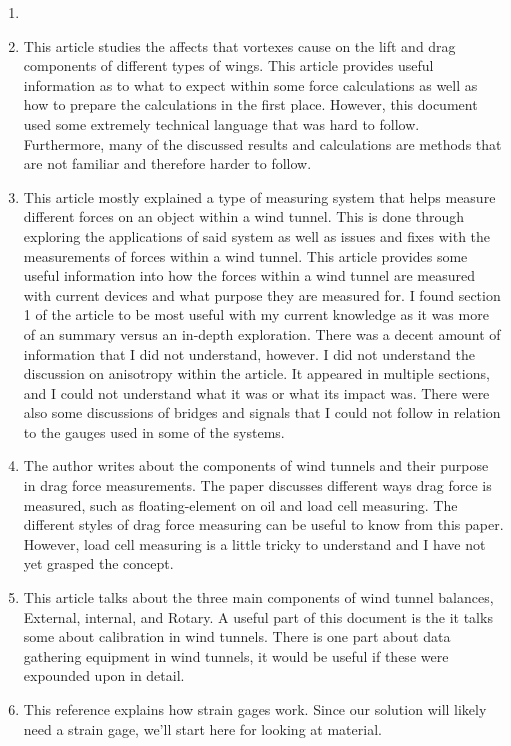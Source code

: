 \documentclass[12pt,letterpaper]{article}
\begin{document}
\begin{enumerate}
	\item \cite{Nan2013}
	\item \cite{Gerontakos2007} This article studies the affects that vortexes cause on the lift and drag components of different types of wings. This article provides useful information as to what to expect within some force calculations as well as how to prepare the calculations in the first place. However, this document used some extremely technical language that was hard to follow. Furthermore, many of the discussed results and calculations are methods that are not familiar and therefore harder to follow.
	\item \cite{Portman2009} This article mostly explained a type of measuring system that helps measure different forces on an object within a wind tunnel. This is done through exploring the applications of said system as well as issues and fixes with the measurements of forces within a wind tunnel. This article provides some useful information into how the forces within a wind tunnel are measured with current devices and what purpose they are measured for. I found section 1 of the article to be most useful with my current knowledge as it was more of an summary versus an in-depth exploration. There was a decent amount of information that I did not understand, however. I did not understand the discussion on anisotropy within the article. It appeared in multiple sections, and I could not understand what it was or what its impact was. There were also some discussions of bridges and signals that I could not follow in relation to the gauges used in some of the systems.
	\item \cite{Nan2013} The author writes about the components of wind tunnels and their purpose in drag force measurements. The paper discusses different ways drag force is measured, such as floating-element on oil and load cell measuring. The different styles of drag force measuring can be useful to know from this paper. However, load cell measuring is a little tricky to understand and I have not yet grasped the concept. 
	
	
	\item \cite{Gonzalez} This article talks about the three main components of wind tunnel balances, External, internal, and Rotary. A useful part of this document is the it talks some about calibration in wind tunnels. There is one part about data gathering equipment in wind tunnels, it would be useful if these were expounded upon in detail.  
	\item \cite{Wilson-strain-gage} This reference explains how strain gages work. Since our solution will likely need a strain gage, we'll start here for looking at material.


\end{enumerate}
\end{document}
